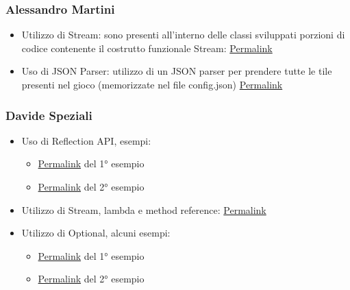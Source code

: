\subsubsection*{Alessandro Martini}
\begin{itemize}
    \item Utilizzo di Stream: sono presenti all'interno delle classi sviluppati porzioni di codice contenente il costrutto funzionale Stream: \href{https://github.com/MauroPello/OOP22-caesena/blob/2e7e1877928505c25e791d2e1ba6e5ebffffca64/src/main/java/it/unibo/caesena/model/gameset/GameSetImpl.java}{Permalink}
    \item Uso di JSON Parser: utilizzo di un JSON parser per prendere tutte le tile presenti nel gioco (memorizzate nel file config.json) \href{https://github.com/MauroPello/OOP22-caesena/blob/2e7e1877928505c25e791d2e1ba6e5ebffffca64/src/main/java/it/unibo/caesena/controller/ConfigurationLoader.java}{Permalink}
\end{itemize}

\subsubsection*{Davide Speziali}
\begin{itemize}
    \item Uso di Reflection API, esempi:
    \begin{itemize}
        \item \href{https://github.com/MauroPello/OOP22-caesena/blob/6909013173eb4b59dfca884397947f9b4175ae8c/src/main/java/it/unibo/caesena/utils/StringUtil.java#L168}{Permalink} del 1° esempio
        \item \href{https://github.com/MauroPello/OOP22-caesena/blob/6909013173eb4b59dfca884397947f9b4175ae8c/src/main/java/it/unibo/caesena/model/tile/TileType.java#L144}{Permalink} del 2° esempio
    \end{itemize}
    \item Utilizzo di Stream, lambda e method reference: \href{https://github.com/MauroPello/OOP22-caesena/blob/6909013173eb4b59dfca884397947f9b4175ae8c/src/main/java/it/unibo/caesena/view/components/board/SectionSelectorComponentImpl.java#L196}{Permalink}
    \item Utilizzo di Optional, alcuni esempi:
    \begin{itemize}
        \item \href{https://github.com/MauroPello/OOP22-caesena/blob/6909013173eb4b59dfca884397947f9b4175ae8c/src/main/java/it/unibo/caesena/view/components/tile/TileImage.java#L25}{Permalink} del 1° esempio
        \item \href{https://github.com/MauroPello/OOP22-caesena/blob/6909013173eb4b59dfca884397947f9b4175ae8c/src/main/java/it/unibo/caesena/view/components/board/BoardComponentImpl.java#L300}{Permalink} del 2° esempio
    \end{itemize}
\end{itemize}

